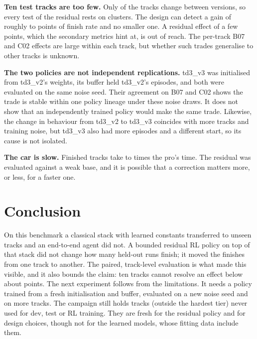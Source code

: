 \documentclass[conference]{IEEEtran}
\begin{document}
\textbf{Ten test tracks are too few.} Only \InformativeMaps of the \NTest tracks change between versions, so
every test of the residual rests on \InformativeMaps clusters. The design can detect a gain of roughly \PowerLoGain to
\PowerHiGain points of finish rate and no smaller one. A residual effect of a few points, which the secondary
metrics hint at, is out of reach. The per-track B07 and C02 effects are large within each track, but whether
such trades generalise to other tracks is unknown.

\textbf{The two policies are not independent replications.} td3\_v3 was initialised from td3\_v2's weights,
its buffer held td3\_v2's episodes, and both were evaluated on the same noise seed. Their agreement on B07 and
C02 shows the trade is stable within one policy lineage under these noise draws. It does not show that an
independently trained policy would make the same trade. Likewise, the change in behaviour from td3\_v2 to
td3\_v3 coincides with more tracks and training noise, but td3\_v3 also had more episodes and a different
start, so its cause is not isolated.

\textbf{The car is slow.} Finished tracks take \TimeRatioLo to \TimeRatioHi times the pro's time. The
residual was evaluated against a weak base, and it is possible that a correction matters more, or less, for
a faster one.

\section{Conclusion}

On this benchmark a classical stack with learned constants transferred to unseen tracks and an end-to-end
agent did not. A bounded residual RL policy on top of that stack did not change how many held-out runs
finish; it moved the finishes from one track to another. The paired, track-level evaluation is what made this
visible, and it also bounds the claim: ten tracks cannot resolve an effect below about \PowerLoGain points.
The next experiment follows from the limitations. It needs a policy trained from a fresh initialisation and
buffer, evaluated on a new noise seed and on more tracks. The campaign still holds \FreshMaps tracks
(\FreshMapsNonBlack outside the hardest tier) never used for dev, test or RL training. They are fresh for the
residual policy and for design choices, though not for the learned models, whose fitting data include them.



\end{document}

